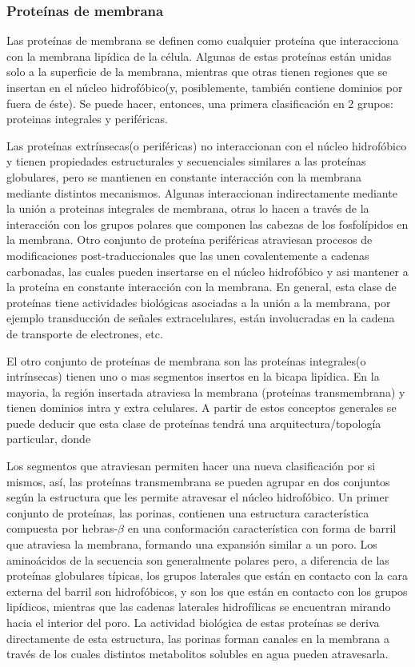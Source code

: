\subsubsection{Proteínas de membrana}
Las proteínas de membrana se definen como cualquier proteína que interacciona con la membrana lipídica de la célula.
Algunas de estas proteínas están unidas solo a la superficie de la membrana, mientras que otras tienen regiones que se insertan en el núcleo hidrofóbico(y, posiblemente, también contiene dominios por fuera de éste). 
Se puede hacer, entonces, una primera clasificación en 2 grupos: proteinas integrales y periféricas.

Las proteínas extrínsecas(o periféricas) no interaccionan con el núcleo hidrofóbico y tienen propiedades estructurales y secuenciales similares a las proteínas globulares, 
pero se mantienen en constante interacción con la membrana mediante distintos mecanismos.
Algunas interaccionan indirectamente mediante la unión a proteinas integrales de membrana, otras lo hacen a través de la interacción con los grupos polares que componen las cabezas de los fosfolípidos en la membrana. 
Otro conjunto de proteína periféricas atraviesan procesos de modificaciones post-traduccionales que las unen covalentemente a cadenas carbonadas, las cuales pueden insertarse en el núcleo hidrofóbico y
asi mantener a la proteína en constante interacción con la membrana.
En general, esta clase de proteínas tiene actividades biológicas asociadas a la unión a la membrana, por ejemplo transducción de señales extracelulares, están involucradas en la cadena de transporte de electrones, etc.

El otro conjunto de proteínas de membrana son las proteínas integrales(o intrínsecas) tienen uno o mas segmentos insertos en la bicapa lipídica.
En la mayoria, la región insertada atraviesa la membrana (proteínas transmembrana) y tienen dominios intra y extra celulares.
A partir de estos conceptos generales se puede deducir que esta clase de proteínas tendrá una arquitectura/topología particular, donde 

Los segmentos que atraviesan permiten hacer una nueva clasificación por si mismos, así, las proteínas transmembrana se pueden agrupar en dos conjuntos según la estructura que les permite atravesar el núcleo hidrofóbico.
Un primer conjunto de proteínas, las porinas, contienen una estructura característica compuesta por hebras-$\beta$ en una conformación característica con forma de barril que atraviesa la membrana, formando una expansión similar a un poro.
Los aminoácidos de la secuencia son generalmente polares pero, a diferencia de las proteínas globulares típicas, los grupos laterales que están en contacto con la cara externa del barril son hidrofóbicos, y son los que están en contacto con 
los grupos lipídicos, mientras que las cadenas laterales hidrofílicas se encuentran mirando hacia el interior del poro.
La actividad biológica de estas proteínas se deriva directamente de esta estructura, las porinas forman canales en la membrana a través de los cuales distintos metabolitos solubles en agua pueden atravesarla. 

